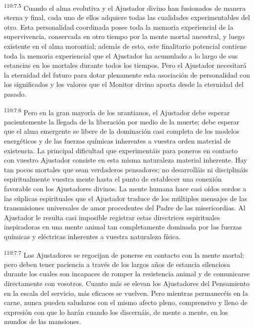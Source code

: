 \par
\textsuperscript{110:7.5} Cuando el alma evolutiva y el Ajustador divino han fusionados de manera eterna y final, cada uno de ellos adquiere todas las cualidades experimentables del otro. Esta personalidad coordinada posee toda la memoria experiencial de la supervivencia, conservada en otro tiempo por la mente mortal ancestral, y luego existente en el alma morontial; además de esto, este finalitario potencial contiene toda la memoria experiencial que el Ajustador ha acumulado a lo largo de sus estancias en los mortales durante todos los tiempos. Pero el Ajustador necesitará la eternidad del futuro para dotar plenamente esta asociación de personalidad con los significados y los valores que el Monitor divino aporta desde la eternidad del pasado.

\par
\textsuperscript{110:7.6} Pero en la gran mayoría de los urantianos, el Ajustador debe esperar pacientemente la llegada de la liberación por medio de la muerte; debe esperar que el alma emergente se libere de la dominación casi completa de los modelos energéticos y de las fuerzas químicas inherentes a vuestra orden material de existencia. La principal dificultad que experimentáis para poneros en contacto con vuestro Ajustador consiste en esta misma naturaleza material inherente. Hay tan pocos mortales que sean verdaderos pensadores; no desarrolláis ni disciplináis espiritualmente vuestra mente hasta el punto de establecer una conexión favorable con los Ajustadores divinos. La mente humana hace casi oídos sordos a las súplicas espirituales que el Ajustador traduce de los múltiples mensajes de las transmisiones universales de amor procedentes del Padre de las misericordias. Al Ajustador le resulta casi imposible registrar estas directrices espirituales inspiradoras en una mente animal tan completamente dominada por las fuerzas químicas y eléctricas inherentes a vuestra naturaleza física.

\par
\textsuperscript{110:7.7} Los Ajustadores se regocijan de ponerse en contacto con la mente mortal; pero deben tener paciencia a través de los largos años de estancia silenciosa durante los cuales son incapaces de romper la resistencia animal y de comunicarse directamente con vosotros. Cuanto más se elevan los Ajustadores del Pensamiento en la escala del servicio, más eficaces se vuelven. Pero mientras permanecéis en la carne, nunca pueden saludaros con el mismo afecto pleno, comprensivo y lleno de expresión con que lo harán cuando los discernáis, de mente a mente, en los mundos de las mansiones.

